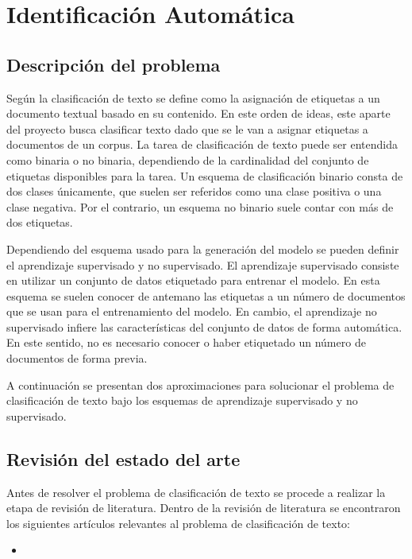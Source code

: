 \section{Identificación Automática}

\subsection{Descripción del problema}
Según \cite{DC_SPRINGER} la clasificación de texto se define como la asignación de etiquetas a un documento textual basado en su contenido. En este orden de ideas, este aparte del proyecto busca clasificar texto dado que se le van a asignar etiquetas a documentos de un corpus. La tarea de clasificación de texto puede ser entendida como binaria o no binaria, dependiendo de la cardinalidad del conjunto de etiquetas disponibles para la tarea. Un esquema de clasificación binario consta de dos clases únicamente, que suelen ser referidos como una clase positiva o una clase negativa. Por el contrario, un esquema no binario suele contar con más de dos etiquetas.

Dependiendo del esquema usado para la generación del modelo se pueden definir el aprendizaje supervisado y no supervisado. El aprendizaje supervisado consiste en utilizar un conjunto de datos etiquetado para entrenar el modelo. En esta esquema se suelen conocer de antemano las etiquetas a un número de documentos que se usan para el entrenamiento del modelo. En cambio, el aprendizaje no supervisado infiere las características del conjunto de datos de forma automática. En este sentido, no es necesario conocer o haber etiquetado un número de documentos de forma previa. 

A continuación se presentan dos aproximaciones para solucionar el problema de clasificación de texto bajo los esquemas de aprendizaje supervisado y no supervisado. 

\subsection{Revisión del estado del arte}
Antes de resolver el problema de clasificación de texto se procede a realizar la etapa de revisión de literatura. Dentro de la revisión de literatura se encontraron los siguientes artículos relevantes al problema de clasificación de texto:

\begin{itemize}
    \item 
\end{itemize}


